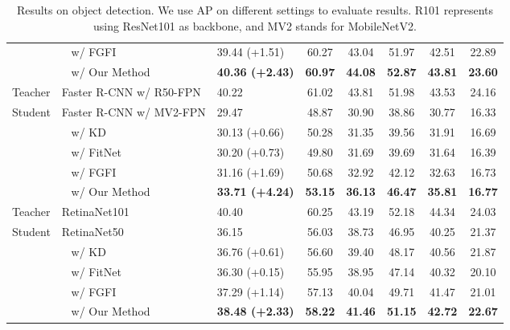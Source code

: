 \documentclass[final]{cvpr}
\begin{document}
\begin{table*}
\begin{tabular}{l l | l @{\hspace{0.3in}} c@{\hspace{0.3in}} c@{\hspace{0.3in}} c@{\hspace{0.3in}} c@{\hspace{0.3in}} c }
		& ~ w/ FGFI \cite{finegrained} &39.44 (+1.51) &60.27 &43.04 &51.97 &42.51 &22.89 \\
		& ~ w/ Our Method &\textbf{40.36 (+2.43)} &\textbf{60.97} &\textbf{44.08} &\textbf{52.87} &\textbf{43.81} &\textbf{23.60} \\
		\midrule
		Teacher                & Faster R-CNN w/ R50-FPN &40.22 &61.02 &43.81 &51.98 &43.53 &24.16 \\
		Student & Faster R-CNN w/ MV2-FPN &29.47 &48.87 &30.90 &38.86 &30.77 &16.33 \\
		& ~ w/ KD \cite{kd}   &30.13 (+0.66) &50.28 &31.35 &39.56 &31.91 &16.69 \\
		& ~ w/ FitNet \cite{fitnet}   &30.20 (+0.73) &49.80 &31.69 &39.69 &31.64 &16.39 \\
		& ~ w/ FGFI \cite{finegrained} &31.16 (+1.69)&50.68 &32.92 &42.12 &32.63 &16.73 \\
		& ~ w/ Our Method &\textbf{33.71 (+4.24)} &\textbf{53.15} &\textbf{36.13} &\textbf{46.47} &\textbf{35.81} &\textbf{16.77} \\
		\midrule
		Teacher                & RetinaNet101       &40.40 &60.25 &43.19 &52.18 &44.34 &24.03 \\
		Student & RetinaNet50        &36.15 &56.03 &38.73 &46.95 &40.25 &21.37 \\
		& ~ w/ KD \cite{kd} 			 &36.76 (+0.61) &56.60 &39.40 &48.17 &40.56 &21.87 \\
		& ~ w/ FitNet \cite{fitnet}   &36.30 (+0.15) &55.95 &38.95 &47.14 &40.32 &20.10 \\
		& ~ w/ FGFI \cite{finegrained}        &37.29 (+1.14) &57.13 &40.04 &49.71 &41.47 &21.01 \\
		& ~ w/ Our Method &\textbf{38.48 (+2.33)} &\textbf{58.22} &\textbf{41.46} &\textbf{51.15} &\textbf{42.72} &\textbf{22.67} \\
		\bottomrule
	\end{tabular}
	\vspace{0.1in}
	\caption{Results on object detection. We use AP on different settings to evaluate results. R101 represents using ResNet101 as backbone, and MV2 stands for MobileNetV2.}
	\label{tab:detection}
\end{table*}
\end{document}
